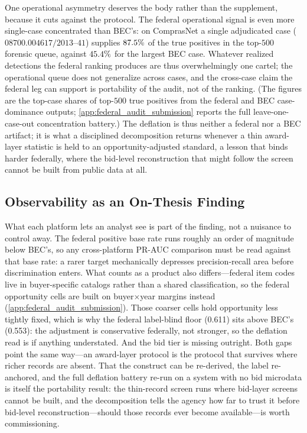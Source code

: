 One operational asymmetry deserves the body rather than the supplement,
because it cuts against the protocol. The federal operational signal is
even more single-case concentrated than BEC's: on ComprasNet a single
adjudicated case ($08700.004617/2013$--$41$) supplies
$87.5\%$ of the true positives in the top-$500$ forensic
queue, against $45.4\%$ for the largest BEC case. Whatever
realized detections the federal ranking produces are thus overwhelmingly
one cartel; the operational queue does not generalize across cases, and
the cross-case claim the federal leg can support is portability of the
audit, not of the ranking. (The figures are the top-case shares of
top-$500$ true positives from the federal and BEC case-dominance
outputs; \ref{app:federal_audit_submission} reports the full
leave-one-case-out concentration battery.) The deflation is thus
neither a federal nor a BEC artifact; it is what a disciplined
decomposition returns whenever a thin award-layer statistic is held to
an opportunity-adjusted standard, a lesson that binds harder federally,
where the bid-level reconstruction that might follow the screen cannot
be built from public data at all.

\subsection{Observability as an On-Thesis Finding}
\label{sec:comparative_observability}

What each platform lets an analyst see is part of the finding, not a
nuisance to control away. The federal positive base rate runs roughly
an order of magnitude below BEC's, so any cross-platform PR-AUC
comparison must be read against that base rate: a rarer target
mechanically depresses precision-recall area before discrimination
enters. What counts as a product also differs---federal item codes live
in buyer-specific catalogs rather than a shared classification, so the
federal opportunity cells are built on buyer$\times$year margins instead
(\ref{app:federal_audit_submission}). Those coarser cells hold
opportunity less tightly fixed, which is why the federal label-blind
floor (0.611) sits above BEC's (0.553): the adjustment is conservative
federally, not stronger, so the deflation read is if anything
understated. And the bid tier is missing outright. Both gaps point the
same way---an award-layer protocol is the protocol that survives where
richer records are absent. That the construct can be re-derived, the
label re-anchored, and the full deflation battery re-run on a system
with no bid microdata is itself the portability result: the thin-record
screen runs where bid-layer screens cannot be built, and the
decomposition tells the agency how far to trust it before bid-level
reconstruction---should those records ever become available---is worth
commissioning.
